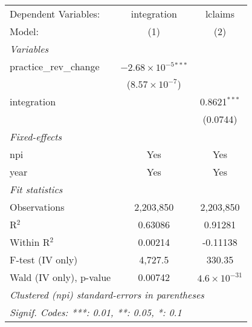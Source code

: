 
\begingroup
\centering
\begin{tabular}{lcc}
   \tabularnewline \midrule \midrule
   Dependent Variables:    & integration                    & lclaims\\  
   Model:                  & (1)                            & (2)\\  
   \midrule
   \emph{Variables}\\
   practice\_rev\_change   & $-2.68\times 10^{-5}$$^{***}$  &   \\   
                           & ($8.57\times 10^{-7}$)         &   \\   
   integration             &                                & 0.8621$^{***}$\\   
                           &                                & (0.0744)\\   
   \midrule
   \emph{Fixed-effects}\\
   npi                     & Yes                            & Yes\\  
   year                    & Yes                            & Yes\\  
   \midrule
   \emph{Fit statistics}\\
   Observations            & 2,203,850                      & 2,203,850\\  
   R$^2$                   & 0.63086                        & 0.91281\\  
   Within R$^2$            & 0.00214                        & -0.11138\\  
   F-test (IV only)        & 4,727.5                        & 330.35\\  
   Wald (IV only), p-value & 0.00742                        & $4.6\times 10^{-31}$\\   
   \midrule \midrule
   \multicolumn{3}{l}{\emph{Clustered (npi) standard-errors in parentheses}}\\
   \multicolumn{3}{l}{\emph{Signif. Codes: ***: 0.01, **: 0.05, *: 0.1}}\\
\end{tabular}
\par\endgroup


